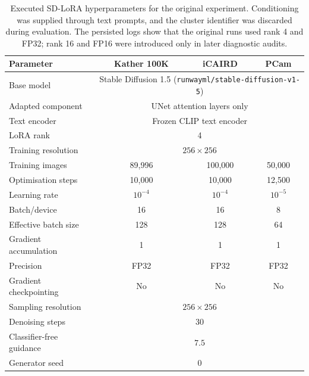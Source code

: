 \begin{table}[htbp]
\centering
\small
\setlength{\tabcolsep}{4pt}
\begin{tabular}{lccc}
\toprule
Parameter & Kather 100K & iCAIRD & PCam \\
\midrule
Base model & \multicolumn{3}{c}{Stable Diffusion 1.5
(\texttt{runwayml/stable-diffusion-v1-5})} \\
Adapted component & \multicolumn{3}{c}{UNet attention layers only} \\
Text encoder & \multicolumn{3}{c}{Frozen CLIP text encoder} \\
LoRA rank & \multicolumn{3}{c}{4} \\
Training resolution & \multicolumn{3}{c}{$256\times256$} \\
Training images & 89,996 & 100,000 & 50,000 \\
Optimisation steps & 10,000 & 10,000 & 12,500 \\
Learning rate & $10^{-4}$ & $10^{-4}$ & $10^{-5}$ \\
Batch/device & 16 & 16 & 8 \\
Effective batch size & 128 & 128 & 64 \\
Gradient accumulation & 1 & 1 & 1 \\
Precision & FP32 & FP32 & FP32 \\
Gradient checkpointing & No & No & No \\
Sampling resolution & \multicolumn{3}{c}{$256\times256$} \\
Denoising steps & \multicolumn{3}{c}{30} \\
Classifier-free guidance & \multicolumn{3}{c}{$7.5$} \\
Generator seed & \multicolumn{3}{c}{0} \\
\bottomrule
\end{tabular}
\caption{Executed SD-LoRA hyperparameters for the original experiment.
Conditioning was supplied through text prompts, and the cluster identifier
was discarded during evaluation. The persisted logs show that the original
runs used rank 4 and FP32; rank 16 and FP16 were introduced only in later
diagnostic audits.}
\label{tab:sd-lora-hyperparameters}
\end{table}

